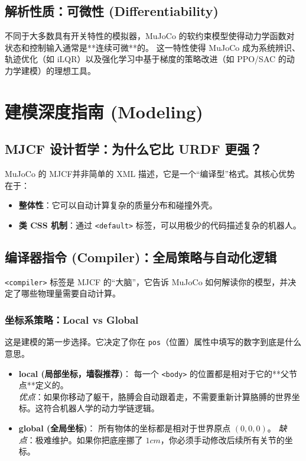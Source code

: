\documentclass[11pt,a4paper]{book}
\begin{document}
\section{解析性质：可微性 (Differentiability)}
不同于大多数具有开关特性的模拟器，MuJoCo 的软约束模型使得动力学函数对状态和控制输入通常是**连续可微**的。
这一特性使得 MuJoCo 成为系统辨识、轨迹优化（如 iLQR）以及强化学习中基于梯度的策略改进（如 PPO/SAC 的动力学建模）的理想工具。



\chapter{建模深度指南 (Modeling)}

\section{MJCF 设计哲学：为什么它比 URDF 更强？}
MuJoCo 的 MJCF并非简单的 XML 描述，它是一个“编译型”格式。其核心优势在于：
\begin{itemize}
    \item \textbf{整体性}：它可以自动计算复杂的质量分布和碰撞外壳。
    \item \textbf{类 CSS 机制}：通过 \texttt{<default>} 标签，可以用极少的代码描述复杂的机器人。
\end{itemize}

\section{编译器指令 (Compiler)：全局策略与自动化逻辑}
\texttt{<compiler>} 标签是 MJCF 的“大脑”，它告诉 MuJoCo 如何解读你的模型，并决定了哪些物理量需要自动计算。

\subsection{坐标系策略：Local vs Global}
这是建模的第一步选择。它决定了你在 \texttt{pos}（位置）属性中填写的数字到底是什么意思。

\begin{itemize}
    \item \textbf{local (局部坐标，墙裂推荐)}：
    每一个 \texttt{<body>} 的位置都是相对于它的**父节点**定义的。\\
    \textit{优点}：如果你移动了躯干，胳膊会自动跟着走，不需要重新计算胳膊的世界坐标。这符合机器人学的动力学链逻辑。
    \item \textbf{global (全局坐标)}：
    所有物体的坐标都是相对于世界原点 $(0,0,0)$。
    \textit{缺点}：极难维护。如果你把底座挪了 $1cm$，你必须手动修改后续所有关节的坐标。
\end{itemize}
\end{document}
